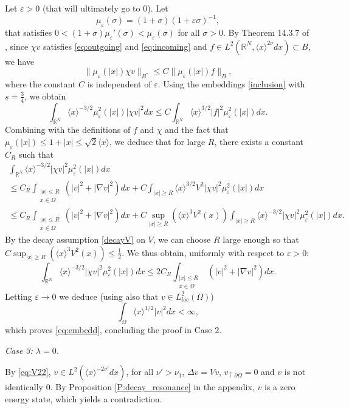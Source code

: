 \documentclass[10pt,leqno]{amsart}
\theoremstyle{definition}%
\theoremstyle{remark}
\numberwithin{equation}{section}
\newcommand{\R}{\mathbb{R}}
\def\eps{\varepsilon}
\renewcommand{\^}{\widehat}%
\begin{document}
Let $\eps>0$ (that will ultimately go to $0$). Let 
$$\mu_{\eps}(\sigma)=(1+\sigma)(1+\eps \sigma)^{-1},$$
that satisfies $0<(1+\sigma)\mu_{\eps}'(\sigma)<\mu_{\eps}(\sigma)$ for all $\sigma>0$. By Theorem 14.3.7 of \cite{Hormander.T2}, since $\chi v$ satisfies \eqref{eq:outgoing} and \eqref{eq:incoming} and $f\in L^2\left( \R^N,\langle x\rangle^{2\nu}dx \right)\subset B$, we have
$$ \big\|\mu_{\eps}(|x|) \chi v\big\|_{B^*}\leq C \big\|\mu_{\eps}(|x|) f\big\|_{B},$$
where the constant $C$ is independent of $\eps$. Using the embeddings \eqref{inclusion} with $s=\frac{3}{4}$, we obtain 
$$ \int_{\R^N} \langle x\rangle^{-3/2} \mu_{\eps}^2(|x|)|\chi v|^2dx\leq C\int_{\R^N} \langle x\rangle^{3/2} |f|^2 \mu_{\eps}^2(|x|)dx.$$
Combining with the definitions of $f$ and $\chi$ and the fact that $\mu_{\eps}(|x|)\leq 1+|x|\leq \sqrt{2}\langle x\rangle$, we deduce that for large $R$, there exists a constant $C_R$ such that
\begin{multline}
 \int_{\R^N} \langle x\rangle^{-3/2} |\chi v|^2\mu_{\eps}^2(|x|)dx\\
 \leq C_R \int_{\substack{|x|\leq R\\ x\in \Omega}}\left( |v|^2+|\nabla v|^2 \right)dx+C\int_{|x|\geq R} \langle x\rangle^{3/2} V^2 |\chi v|^2 \mu_{\eps}^2(|x|) dx\\
 \leq C_R \int_{\substack{|x|\leq R\\ x\in \Omega}}\left( |v|^2+|\nabla v|^2 \right)dx+C\sup_{|x|\geq R}\left(\langle x\rangle^{3} V^2(x)\right)  \int_{|x|\geq R} \langle x\rangle^{-3/2} |\chi v|^2 \mu_{\eps}^2(|x|) dx.
\end{multline}
By the decay assumption \eqref{decayV} on $V$, we can choose $R$ large enough so that $C\sup_{|x|\geq R}\left(\langle x\rangle^{3} V^2(x)\right)\leq \frac{1}{2}$. We thus obtain, uniformly with respect to $\eps>0$:
$$ \int_{\R^N} \langle x\rangle^{-3/2} |\chi v|^2\mu_{\eps}^2(|x|)dx\leq 2C_R \int_{\substack{|x|\leq R\\ x\in \Omega}}\left( |v|^2+|\nabla v|^2 \right)dx.$$
Letting $\eps\to 0$ we deduce (using also that $v\in L^2_{loc}(\Omega)$)
$$ \int_{\Omega} \langle x\rangle^{1/2} |v|^2dx<\infty,$$
which proves \eqref{eq:embedd}, concluding the proof in Case 2.

\smallskip



\noindent	\emph{Case 3: $\lambda=0$.}

By \eqref{eq:V22}, $v\in L^2\left( \langle x\rangle^{-2\nu'}dx \right)$, for all $\nu'>\nu_1$, $\Delta v=Vv$, $v_{\restriction \partial \Omega}=0$ and $v$ is not identically $0$. 
By Proposition \ref{P:decay_resonance} in the appendix, $v$ is a zero energy state, which yields a contradiction.
\medskip
\end{document}
